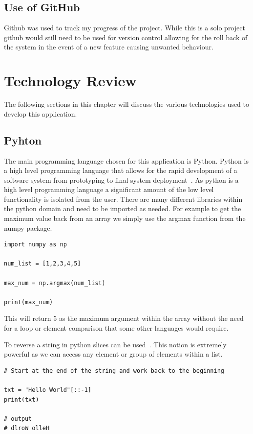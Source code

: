 \section{Use of GitHub}
Github was used to track my progress of the project. While this is a solo project github would still need to be used for version control allowing for the roll back of the system in the event of a new feature causing unwanted behaviour.




\chapter{Technology Review}
The following sections in this chapter will discuss the various technologies used to develop this application.

\section{Pyhton}
The main programming language chosen for this application is Python.
Python is a high level programming language that allows for the rapid development of a software system from prototyping to final system deployment~\cite{Welcomet74:online}. As python is a high level programming language a significant amount of the low level functionality is isolated from the user. There are many different libraries within the python domain and need to be imported as needed. For example to get the maximum value back from an array we simply use the argmax function from the numpy package. 
\begin{verbatim}
import numpy as np

num_list = [1,2,3,4,5]

max_num = np.argmax(num_list)

print(max_num)
\end{verbatim}

This will return 5 as the maximum argument within the array without the need for a loop or element comparison that some other languages would require.

To reverse a string in python slices can be used~\cite{TryitEdi9:online}.
This notion is extremely powerful as we can access any element or group of elements within a list.

\begin{verbatim}
# Start at the end of the string and work back to the beginning

txt = "Hello World"[::-1]
print(txt)

# output
# dlroW olleH
\end{verbatim}


